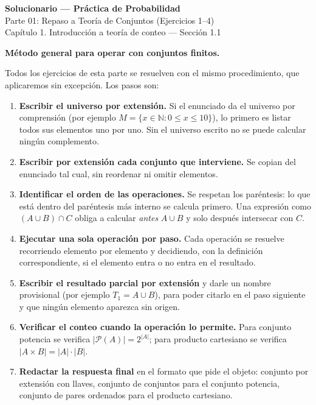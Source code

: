 \documentclass[11pt]{article}
\begin{document}
\begin{center}
	{\LARGE\bfseries Solucionario --- Práctica de Probabilidad}\\[2mm]
	{\large Parte 01: Repaso a Teoría de Conjuntos (Ejercicios 1--4)}\\[1mm]
	{\normalsize Capítulo 1. Introducción a teoría de conteo --- Sección 1.1}
\end{center}

\vspace{4mm}

\begin{teo}
\textbf{Método general para operar con conjuntos finitos.}

Todos los ejercicios de esta parte se resuelven con el mismo procedimiento, que aplicaremos
sin excepción. Los pasos son:

\begin{enumerate}[leftmargin=*]
	\item \textbf{Escribir el universo por extensión.} Si el enunciado da el universo por
	comprensión (por ejemplo $M=\{x\in\mathbb{N}: 0\le x\le 10\}$), lo primero es listar todos
	sus elementos uno por uno. Sin el universo escrito no se puede calcular ningún complemento.
	\item \textbf{Escribir por extensión cada conjunto que interviene.} Se copian del enunciado
	tal cual, sin reordenar ni omitir elementos.
	\item \textbf{Identificar el orden de las operaciones.} Se respetan los paréntesis: lo que
	está dentro del paréntesis más interno se calcula primero. Una expresión como
	$(A\cup B)\cap C$ obliga a calcular \emph{antes} $A\cup B$ y solo después intersecar con $C$.
	\item \textbf{Ejecutar una sola operación por paso.} Cada operación se resuelve recorriendo
	elemento por elemento y decidiendo, con la definición correspondiente, si el elemento entra
	o no entra en el resultado.
	\item \textbf{Escribir el resultado parcial por extensión} y darle un nombre provisional
	(por ejemplo $T_1=A\cup B$), para poder citarlo en el paso siguiente y que ningún elemento
	aparezca sin origen.
	\item \textbf{Verificar el conteo cuando la operación lo permite.} Para conjunto potencia
	se verifica $|\mathcal{P}(A)|=2^{|A|}$; para producto cartesiano se verifica
	$|A\times B|=|A|\cdot|B|$.
	\item \textbf{Redactar la respuesta final} en el formato que pide el objeto: conjunto por
	extensión con llaves, conjunto de conjuntos para el conjunto potencia, conjunto de pares
	ordenados para el producto cartesiano.
\end{enumerate}
\end{teo}
\end{document}
